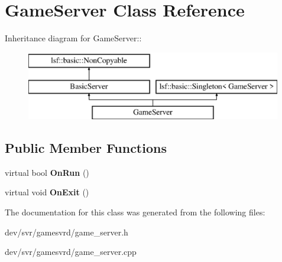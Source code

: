 \hypertarget{classGameServer}{
\section{GameServer Class Reference}
\label{classGameServer}
}
Inheritance diagram for GameServer::\begin{figure}[H]
\begin{center}
\leavevmode
\includegraphics[height=3cm]{classGameServer}
\end{center}
\end{figure}
\subsection*{Public Member Functions}
\begin{DoxyCompactItemize}
\item 
\hypertarget{classGameServer_a7e20ecd0b94dc92da9e4b7564f8c0bc8}{
virtual bool {\bfseries OnRun} ()}
\label{classGameServer_a7e20ecd0b94dc92da9e4b7564f8c0bc8}

\item 
\hypertarget{classGameServer_a2174a01c41753000b241d60ac3b23ae3}{
virtual void {\bfseries OnExit} ()}
\label{classGameServer_a2174a01c41753000b241d60ac3b23ae3}

\end{DoxyCompactItemize}


The documentation for this class was generated from the following files:\begin{DoxyCompactItemize}
\item 
dev/svr/gamesvrd/game\_\-server.h\item 
dev/svr/gamesvrd/game\_\-server.cpp\end{DoxyCompactItemize}

